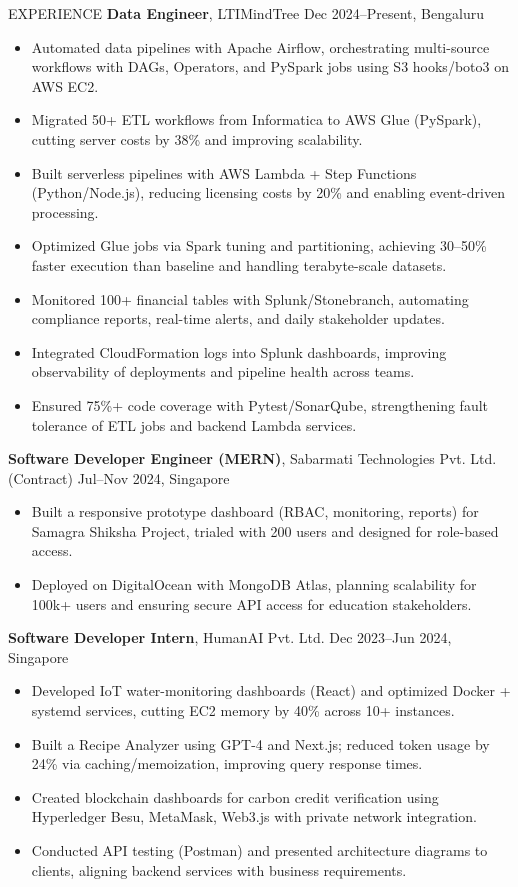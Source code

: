 \documentclass[10pt]{resume}
\begin{document}
\begin{rSection}{EXPERIENCE}
\textbf{Data Engineer}, LTIMindTree \hfill Dec 2024--Present, Bengaluru
\begin{itemize}
    \item Automated data pipelines with Apache Airflow, orchestrating multi-source workflows with DAGs, Operators, and PySpark jobs using S3 hooks/boto3 on AWS EC2.
    \item Migrated 50+ ETL workflows from Informatica to AWS Glue (PySpark), cutting server costs by 38\% and improving scalability.
    \item Built serverless pipelines with AWS Lambda + Step Functions (Python/Node.js), reducing licensing costs by 20\% and enabling event-driven processing.
    \item Optimized Glue jobs via Spark tuning and partitioning, achieving 30--50\% faster execution than baseline and handling terabyte-scale datasets.
    \item Monitored 100+ financial tables with Splunk/Stonebranch, automating compliance reports, real-time alerts, and daily stakeholder updates.
    \item Integrated CloudFormation logs into Splunk dashboards, improving observability of deployments and pipeline health across teams.
    \item Ensured 75\%+ code coverage with Pytest/SonarQube, strengthening fault tolerance of ETL jobs and backend Lambda services.
\end{itemize}

\textbf{Software Developer Engineer (MERN)}, Sabarmati Technologies Pvt. Ltd. (Contract) \hfill Jul--Nov 2024, Singapore
\begin{itemize}
    \item Built a responsive  prototype dashboard (RBAC, monitoring, reports) for Samagra Shiksha Project, trialed with 200 users and designed for role-based access.
    \item Deployed on DigitalOcean with MongoDB Atlas, planning scalability for 100k+ users and ensuring secure API access for education stakeholders.
\end{itemize}

\textbf{Software Developer Intern}, HumanAI Pvt. Ltd. \hfill Dec 2023--Jun 2024, Singapore
\begin{itemize}
    \item Developed IoT water-monitoring dashboards (React) and optimized Docker + systemd services, cutting EC2 memory by 40\% across 10+ instances.
    \item Built a Recipe Analyzer using GPT-4 and Next.js; reduced token usage by 24\% via caching/memoization, improving query response times.
    \item Created blockchain dashboards for carbon credit verification using Hyperledger Besu, MetaMask, Web3.js with private network integration.
    \item Conducted API testing (Postman) and presented architecture diagrams to clients, aligning backend services with business requirements.
\end{itemize}
\end{rSection}
\end{document}
